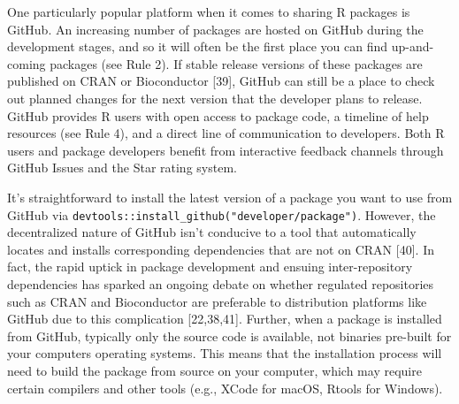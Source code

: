\documentclass[10pt,letterpaper]{article}
\begin{document}
One particularly popular platform when it comes to sharing R packages is
GitHub. An increasing number of packages are hosted on GitHub during the
development stages, and so it will often be the first place you can find
up-and-coming packages (see Rule 2). If stable release versions of these
packages are published on CRAN or Bioconductor {[}39{]}, GitHub can
still be a place to check out planned changes for the next version that
the developer plans to release. GitHub provides R users with open access
to package code, a timeline of help resources (see Rule 4), and a direct
line of communication to developers. Both R users and package developers
benefit from interactive feedback channels through GitHub Issues and the
Star rating system.

It's straightforward to install the latest version of a package you want
to use from GitHub via
\texttt{devtools::install\_github("developer/package")}. However, the
decentralized nature of GitHub isn't conducive to a tool that
automatically locates and installs corresponding dependencies that are
not on CRAN {[}40{]}. In fact, the rapid uptick in package development
and ensuing inter-repository dependencies has sparked an ongoing debate
on whether regulated repositories such as CRAN and Bioconductor are
preferable to distribution platforms like GitHub due to this
complication {[}22,38,41{]}. Further, when a package is installed from
GitHub, typically only the source code is available, not binaries
pre-built for your computers operating systems. This means that the
installation process will need to build the package from source on your
computer, which may require certain compilers and other tools (e.g.,
XCode for macOS, Rtools for Windows).
\end{document}
